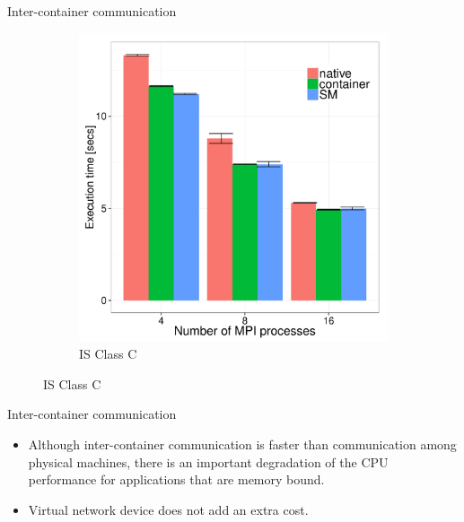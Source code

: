 \documentclass[presentation]{beamer}
\begin{document}
\begin{frame}[label=sec-3-5]{Inter-container communication}
\begin{figure}[H]
\begin{subfigure}[b]{0.42\textwidth}
    \includegraphics[scale=0.25,angle=0]{figures/inter-container-isC.pdf}
    \caption{IS Class C}
  \end{subfigure}
\end{figure}
\end{frame}

\begin{frame}[label=sec-3-6]{Inter-container communication}
\begin{table}
  \scriptsize




\end{table}


\begin{itemize}
\item Although inter-container communication is faster
than communication among physical machines, there is an important degradation
of the CPU performance for applications that are memory bound.

\item Virtual network device does not add an extra cost.
\end{itemize}
\end{frame}
\end{document}
